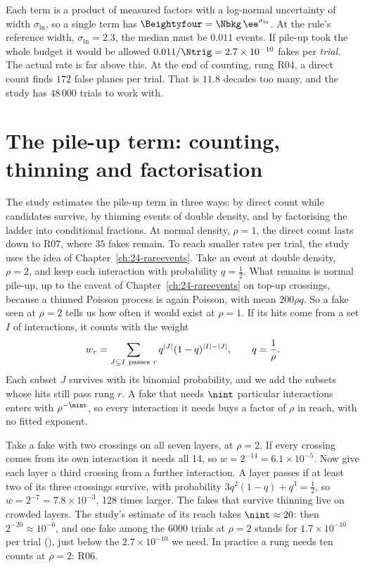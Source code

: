 Each term is a product of measured factors with a log-normal uncertainty of width $\sigma_{\ln}$, so a single term has $\Beightyfour=\Nbkg\,\ee^{\sigma_{\ln}}$.
At the rule's reference width, $\sigma_{\ln}=2.3$, the median must be $0.011$ events. If pile-up took the whole budget it would be allowed
$0.011/\Ntrig=2.7\times10^{-10}$ fakes per \emph{trial}.
The actual rate is far above this. At the end of counting, rung R04, a direct count finds $172$ false planes per trial. That is $11.8$ decades too many, and the study has
$48\,000$ trials to work with.

\section{The pile-up term: counting, thinning and factorisation}\label{sec:27-pileup}

The study estimates the pile-up term in three ways: by direct count while candidates survive, by thinning events of double density, and by factorising the ladder into conditional fractions. At normal density, $\rho=1$, the direct count lasts down to R07, where
$35$ fakes remain. To reach smaller rates per trial, the study uses the idea of Chapter~\ref{ch:24-rareevents}. Take an event at double density, $\rho=2$, and keep each interaction with probability
$q=\frac12$. What remains is normal pile-up, up to the caveat of Chapter~\ref{ch:24-rareevents} on top-up crossings, because a thinned Poisson process is again Poisson, with mean $200\rho q$. So a fake seen at $\rho=2$ tells us how often it
would exist at $\rho=1$. If its hits come from a set $I$ of interactions, it counts with the weight
\begin{equation}
  w_r=\sum_{J\subseteq I\ {\rm passes}\ r}q^{|J|}(1-q)^{|I|-|J|},\qquad q=\frac1\rho .
  \label{eq:27-thin}
\end{equation}
Each subset $J$ survives with its binomial probability, and we add the subsets whose hits still pass rung $r$. A fake that needs $\nint$ particular interactions enters
with $\rho^{-\nint}$, so every interaction it needs buys a factor of $\rho$ in reach, with no fitted exponent.

\begin{example}\label{exa:27-thin}
Take a fake with two crossings on all seven layers, at $\rho=2$. If every crossing comes from its own interaction it needs all 14, so $w=2^{-14}=6.1\times10^{-5}$. Now give each layer a third crossing from a
further interaction. A layer passes if at least two of its three crossings survive, with probability $3q^2(1-q)+q^3=\frac12$, so $w=2^{-7}=7.8\times10^{-3}$, 128 times larger. The fakes that survive thinning live on crowded layers.
The study's estimate of its reach takes $\nint\approx20$: then $2^{-20}\approx10^{-6}$, and one fake among the $6000$ trials at $\rho=2$ stands for $1.7\times10^{-10}$ per trial (\EST), just below the $2.7\times10^{-10}$ we need. In practice a rung needs ten counts at $\rho=2$: R06.
\end{example}


